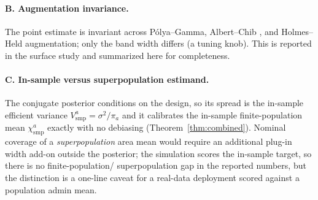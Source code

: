 \documentclass[11pt]{article}
\theoremstyle{remark}
\newcommand{\chia}{\chi^a}
\newcommand{\Vsmp}{V^a_{\mathrm{smp}}}
\begin{document}
\paragraph{B. Augmentation invariance.}
The point estimate is invariant across P\'olya--Gamma, Albert--Chib
\citep{albert1993bayesian}, and Holmes--Held \citep{holmes2006bayesian}
augmentation; only the band width differs (a tuning knob). This is reported in the
surface study and summarized here for completeness.

\paragraph{C. In-sample versus superpopulation estimand.}
The conjugate posterior conditions on the design, so its spread is the in-sample
efficient variance $\Vsmp=\sigma^2/\pi_a$ and it calibrates the in-sample
finite-population mean $\chia_{\mathrm{smp}}$ exactly with no debiasing
(Theorem~\ref{thm:combined}). Nominal coverage of a \emph{superpopulation} area
mean would require an additional plug-in width add-on outside the posterior; the
simulation scores the in-sample target, so there is no finite-population/
superpopulation gap in the reported numbers, but the distinction is a one-line
caveat for a real-data deployment scored against a population admin mean.



\end{document}
